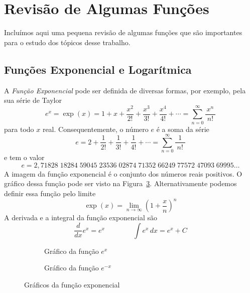 \section{Revisão de Algumas Funções}
\label{sec:Revisao_de_Algumas_Funcoes}

Incluímos aqui uma pequena revisão de algumas funções que são importantes para o
estudo dos tópicos desse trabalho.

\subsection*{Funções Exponencial e Logarítmica}

A \emph{Função Exponencial} pode ser definida de
diversas formas, por exemplo, pela sua série de Taylor
\[
  e^x = \exp(x)
      = 1 + x + \frac{x^2}{2!} + \frac{x^3}{3!} + \frac{x^4}{4!} + \cdots
      = \sum_{n=0}^{\infty} \frac{x^n}{\;n!\;}
\]
para todo $x$ real.
Consequentemente, o número $e$ é a soma da série
\[
  e = 2 + \frac{1}{2!} + \frac{1}{3!} + \frac{1}{4!} + \cdots
    = \sum_{n=0}^{\infty} \frac{1}{\;n!\;}
\]
e tem o valor
\[
 e = 2,71828\;18284\;59045\;23536\;02874\;71352\;66249\;77572\;47093\;69995\dots
\]
A imagem da função exponencial é o conjunto dos números reais positivos.
O gráfico dessa função pode ser visto na Figura~\ref{fig:functions_exp}.
Alternativamente podemos definir essa função pelo limite
\begin{equation}
  \label{eq:exponencial-pelo-limite}
  \exp(x) = \lim_{n\to\infty} \left( 1 + \frac{x}{n} \right)^n
\end{equation}
A derivada e a integral da função exponencial são
\[
 \frac{d}{dx} e^x = e^x
 \qquad\qquad
 \int e^x\,dx = e^x + C
\]

\begin{figure}[t]
  \centering
  \begin{subfigure}[b]{0.5\linewidth}
    \centering
    
    \caption{Gráfico da função $e^{x}$}
    \label{fig:functions_exp_positiva}
  \end{subfigure}%
  \begin{subfigure}[b]{0.5\linewidth}
    \centering
    
    \caption{Gráfico da função $e^{-x}$}
    \label{fig:functions_exp_negativa}
  \end{subfigure}
  \caption{Gráficos da função exponencial}
  \label{fig:functions_exp}
\end{figure}

